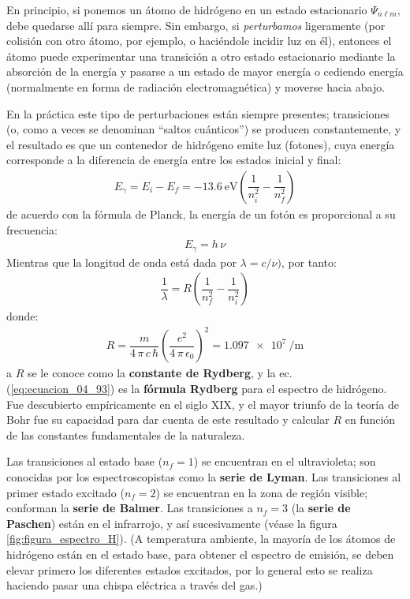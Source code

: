 En principio, si ponemos un átomo de hidrógeno en un estado estacionario $\Psi_{n \ell m}$, debe quedarse allí para siempre. Sin embargo, si \emph{perturbamos} ligeramente (por colisión con otro átomo, por ejemplo, o haciéndole incidir  luz en él), entonces el átomo puede experimentar una transición a otro estado estacionario mediante la absorción de la energía y pasarse a un estado de mayor energía o cediendo energía (normalmente en forma de radiación electromagnética) y moverse  hacia abajo.
\par
En la práctica este tipo de perturbaciones están siempre presentes; transiciones (o, como a veces se denominan \enquote{saltos cuánticos}) se producen constantemente, y el resultado es que un contenedor de hidrógeno emite luz (fotones), cuya energía corresponde a la diferencia de energía entre los estados inicial y final:
\begin{align}
E_{\gamma} = E_{i} - E_{f} = \SI{-13.6}{\electronvolt} \left( \dfrac{1}{n_{i}^{2}} - \dfrac{1}{n_{f}^{2}} \right)
\label{eq:ecuacion_04_91}
\end{align}
de acuerdo con la fórmula de Planck, la energía de un fotón es proporcional a su frecuencia:
\begin{align}
E_{\gamma} = h \, \nu
\label{eq:ecuacion_04_92}
\end{align}
Mientras que la longitud de onda está dada por $\lambda = c / \nu)$, por tanto:
\begin{align}
\dfrac{1}{\lambda} = R \left( \dfrac{1}{n_{f}^{2}} - \dfrac{1}{n_{i}^{2}} \right)
\label{eq:ecuacion_04_93}
\end{align}
donde:
\begin{align}
R = \dfrac{m}{4 \, \pi \, c \, \hbar} \left( \dfrac{e^{2}}{4 \, \pi \, \epsilon_{0}} \right)^{2} = \SI{1.097e7}{\per\metre}
\label{eq:ecuacion_04_94}
\end{align}
a $R$ se le conoce como la \textbf{constante de Rydberg}, y la ec. (\ref{eq:ecuacion_04_93}) es la \textbf{fórmula Rydberg} para el espectro de hidrógeno. Fue descubierto empíricamente en el siglo XIX, y el mayor triunfo de la teoría de Bohr fue su capacidad para dar cuenta de este resultado y calcular $R$ en función de las constantes fundamentales de la naturaleza.
\par
Las transiciones al estado base ($n_{f}= 1$) se encuentran en el ultravioleta; son conocidas por los espectroscopistas como la \textbf{serie de Lyman}. Las transiciones al primer estado excitado ($n_{f}= 2$) se encuentran en la zona de región visible; conforman la \textbf{serie de Balmer}. Las transiciones a $n_{f} = 3$ (la \textbf{serie de Paschen}) están en el infrarrojo, y así sucesivamente (véase la figura \ref{fig:figura_espectro_H}). (A temperatura ambiente, la mayoría de los átomos de hidrógeno están en el estado base, para obtener el espectro de emisión, se deben elevar primero los diferentes estados excitados, por lo general esto se realiza haciendo pasar una chispa eléctrica a través del gas.)
